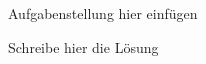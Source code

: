 \subsubsection{} %

Aufgabenstellung hier einfügen

\vspace{1\baselineskip}

\begin{solution}    

    \vspace{1\baselineskip}

    Schreibe hier die Lösung

\end{solution}
